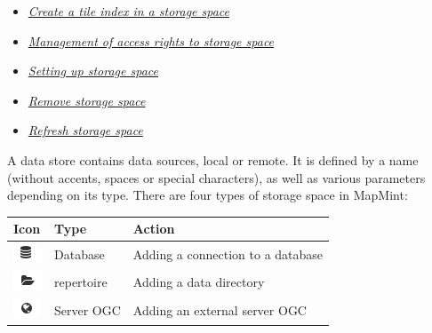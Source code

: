 \documentclass[letterpaper,10pt,english]{sphinxmanual}
\begin{document}
{\begin{minipage}{0.95\linewidth}
\begin{itemize}
\begin{itemize}
\begin{itemize}
\item {} 
\label{data/datastores:id10}{\hyperref[data/datastores:creer-un-index-de-tuiles-dans-un-espace-de-stockage]{\emph{Create a tile index in a storage space}}}

\item {} 
\label{data/datastores:id11}{\hyperref[data/datastores:gestion-des-droits-d-acces-d-un-espace-de-stockage]{\emph{Management of access rights to storage space}}}

\item {} 
\label{data/datastores:id12}{\hyperref[data/datastores:parametrage-d-un-espace-de-stockage]{\emph{Setting up storage space}}}

\item {} 
\label{data/datastores:id13}{\hyperref[data/datastores:supprimer-un-espace-de-stockage]{\emph{Remove storage space}}}

\item {} 
\label{data/datastores:id14}{\hyperref[data/datastores:rafraichir-un-espace-de-stockage]{\emph{Refresh storage space}}}

\end{itemize}

\end{itemize}

\end{itemize}
\end{minipage}}
\begin{center}\setlength{\fboxsep}{5pt}\end{center}

A data store contains data sources, local or remote. It is defined by a name (without accents, spaces or special characters), as well as various parameters depending on its type. There are four types of storage space in MapMint:

\begin{tabulary}{\linewidth}{|L|L|L|}
\hline

\textbf{Icon}
 & 
\textbf{Type}
 & 
\textbf{Action}
\\
\hline
\includegraphics{database.png}
 & 
Database
 & 
Adding a connection to a database
\\
\hline
\includegraphics{directory.png}
 & 
repertoire
 & 
Adding a data directory
\\
\hline
\includegraphics{ogcserver.png}
 & 
Server OGC
 & 
Adding an external server OGC
\\
\hline\end{tabulary}
\end{document}
